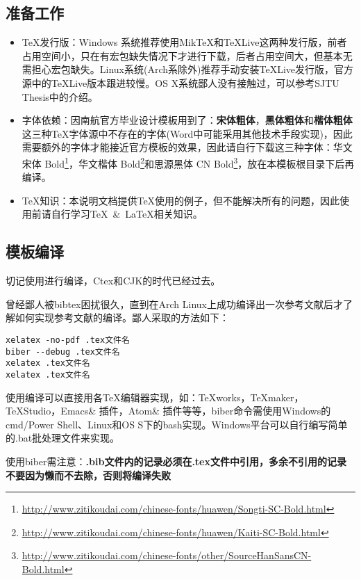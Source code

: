 \subsection{准备工作}
\begin{itemize}
  \item \TeX 发行版：Windows 系统推荐使用MikTeX和TeXLive这两种发行版，前者占用空间小，只在有宏包缺失情况下才进行下载，后者占用空间大，但基本无需担心宏包缺失。Linux系统(Arch系除外)推荐手动安装TeXLive发行版，官方源中的TeXLive版本跟进较慢。OS X系统鄙人没有接触过，可以参考SJTU Thesis中的介绍。
  \item 字体依赖：因南航官方毕业设计模板用到了：\textbf{宋体粗体}，\textbf{黑体粗体}和\textbf{楷体粗体}这三种\TeX 字体源中不存在的字体(Word中可能采用其他技术手段实现)，因此需要额外的字体才能接近官方模板的效果，因此请自行下载这三种字体：华文宋体 Bold\footnote{\url{http://www.zitikoudai.com/chinese-fonts/huawen/Songti-SC-Bold.html}}，华文楷体 Bold\footnote{\url{http://www.zitikoudai.com/chinese-fonts/huawen/Kaiti-SC-Bold.html}}和思源黑体 CN Bold\footnote{\url{http://www.zitikoudai.com/chinese-fonts/other/SourceHanSansCN-Bold.html}}，放在本模板根目录下后再编译。
  \item \TeX 知识：本说明文档提供\TeX 使用的例子，但不能解决所有的问题，因此使用前请自行学习\TeX~\&~\LaTeX 相关知识。
\end{itemize}

\subsection{模板编译}

切记使用\XeLaTeX 进行编译，Ctex和CJK的时代已经过去。

曾经鄙人被bibtex困扰很久，直到在Arch Linux上成功编译出一次参考文献后才了解如何实现参考文献的编译。鄙人采取的方法如下：
\begin{lstlisting}[basicstyle=\small\ttfamily, caption={手动逐次编译}, numbers=none]
xelatex -no-pdf .tex文件名
biber --debug .tex文件名
xelatex .tex文件名
xelatex .tex文件名
\end{lstlisting}

使用\XeLaTeX 编译可以直接用各\TeX 编辑器实现，如：TeXworks，TeXmaker，TeXStudio，Emacs\& 插件，Atom\& 插件等等，biber命令需使用Windows的cmd/Power Shell、Linux和OS S下的bash实现。Windows平台可以自行编写简单的.bat批处理文件来实现。

使用biber需注意：\textbf{.bib文件内的记录必须在.tex文件中引用，多余不引用的记录不要因为懒而不去除，否则将编译失败}

